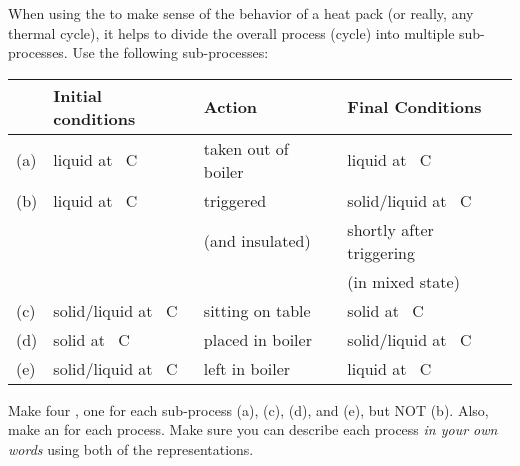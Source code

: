 \label{fnt1.1.3-2}

When using the \EnergyInteractionModel{} to make sense of the behavior of a heat pack (or really, any thermal cycle), it helps to divide the overall process (cycle) into multiple sub-processes.  Use the following sub-processes:

\begin{center}
\begin{tabular}{llll}
	\hline\hline
	&	Initial conditions	&	Action	&	Final Conditions\\
	\hline
	(a)	&	liquid at \unit[100]{\textdegree C}	&	taken out of boiler	&	liquid at \unit[23]{\textdegree C}\\
	(b)	&	liquid at \unit[23]{\textdegree C}	&	triggered	&	solid/liquid at \unit[54]{\textdegree C}\\&& (and insulated)	& shortly after triggering\\&&& (in mixed state)\\
	(c)	&	solid/liquid at \unit[54]{\textdegree C}	&	sitting on table	&	 solid at \unit[23]{\textdegree C}\\
	(d)	&	solid at \unit[23]{\textdegree C}	&	placed in boiler	&	solid/liquid at \unit[54]{\textdegree C}\\
	(e)	&	solid/liquid at \unit[54]{\textdegree C}	&	left in boiler	&	liquid at \unit[100]{\textdegree C}\\
	\hline\hline
\end{tabular}
\end{center}

\noindent Make four \TempGraphs{}, one for each sub-process (a), (c), (d), and (e), but NOT (b). Also, make an \EnergyDiagram{} for each process. Make sure you can describe each process {\em in your own words} using both of the representations. 